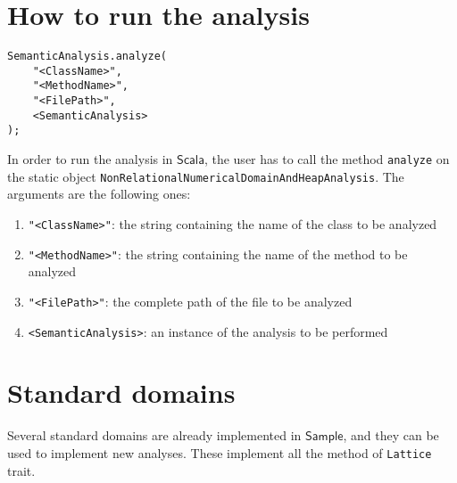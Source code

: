 \documentclass[11pt]{article}
\newcommand{\ScalaAnalyzer}{\ensuremath{\mathsf{Sample}}}
\newcommand{\statement}[1]{\lstinline{#1}}
\newcommand{\Scala}{\ensuremath{\mathsf{Scala}}}
\begin{document}
\section{How to run the analysis}
\begin{lstlisting}
SemanticAnalysis.analyze(
	"<ClassName>",
	"<MethodName>",
	"<FilePath>",
	<SemanticAnalysis>
);
\end{lstlisting}
In order to run the analysis in \Scala, the user has to call the method \statement{analyze} on the static object \statement{NonRelationalNumericalDomainAndHeapAnalysis}. The arguments are the following ones:
\begin{enumerate}
\item \statement{"<ClassName>"}: the string containing the name of the class to be analyzed
\item \statement{"<MethodName>"}: the string containing the name of the method to be analyzed
\item \statement{"<FilePath>"}: the complete path of the file to be analyzed
\item \statement{<SemanticAnalysis>}: an instance of the analysis to be performed
\end{enumerate}

\section{Standard domains}
Several standard domains are already implemented in \ScalaAnalyzer, and they can be used to implement new analyses. These implement all the method of \statement{Lattice} trait.
\end{document}

